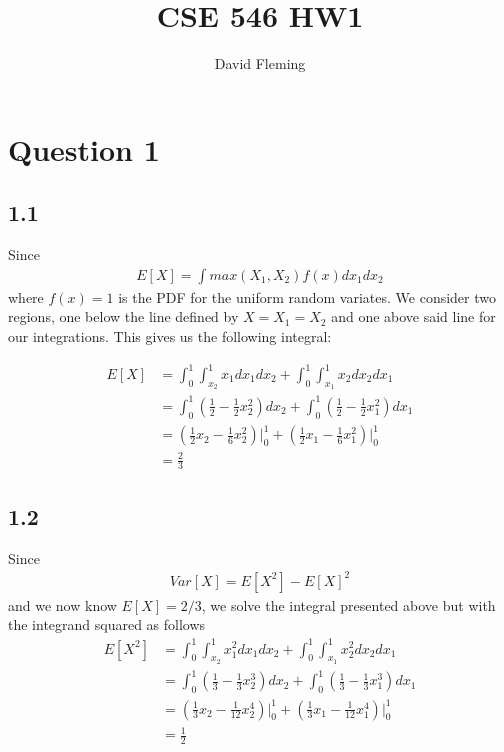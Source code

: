 \documentclass[12pt]{amsart}
\title{CSE 546 HW1}
\author{David Fleming}
\date{}
\begin{document}
\maketitle
\tableofcontents


\section*{Question 1}

\subsection*{1.1}
Since 
\begin{align}
E[X] = \int max(X_1,X_2) f(x) dx_1 dx_2
\end{align}
where $f(x) = 1$ is the PDF for the uniform random variates.  We consider two regions, one below the line defined by $X = X_1 = X_2$ and one above said line for our integrations.  This gives us the following integral:

\begin{equation} \label{eqn:1.1}
\begin{split}
E[X] & = \int_0^1 \int_{x_2}^1 x_1 dx_1 dx_2 + \int_0^1 \int_{x_1}^1 x_2 dx_2 dx_1 \\
& = \int_0^1 (\frac{1}{2} - \frac{1}{2}x_2^2) dx_2 + \int_0^1 (\frac{1}{2} - \frac{1}{2}x_1^2) dx_1 \\
& = (\frac{1}{2}x_2 - \frac{1}{6}x_2^2) \vert_0^1 + (\frac{1}{2}x_1 - \frac{1}{6}x_1^2) \vert_0^1 \\
& = \frac{2}{3}
\end{split}
\end{equation}

\subsection*{1.2}
Since
\begin{align}
Var[X] = E[X^2] - E[X]^2
\end{align}
and we now know $E[X] = 2/3$, we solve the integral presented above but with the integrand squared as follows
\begin{equation} \label{eqn:1.2}
\begin{split}
E[X^2] & = \int_0^1 \int_{x_2}^1 x_1^2 dx_1 dx_2 + \int_0^1 \int_{x_1}^1 x_2^2 dx_2 dx_1 \\
& = \int_0^1 (\frac{1}{3} - \frac{1}{3}x_2^3) dx_2 + \int_0^1 (\frac{1}{3} - \frac{1}{3}x_1^3) dx_1 \\
& = (\frac{1}{3}x_2 - \frac{1}{12}x_2^4)\vert_0^1 + (\frac{1}{3}x_1 - \frac{1}{12}x_1^4)\vert_0^1 \\
& = \frac{1}{2}
\end{split}
\end{equation}
\end{document}
